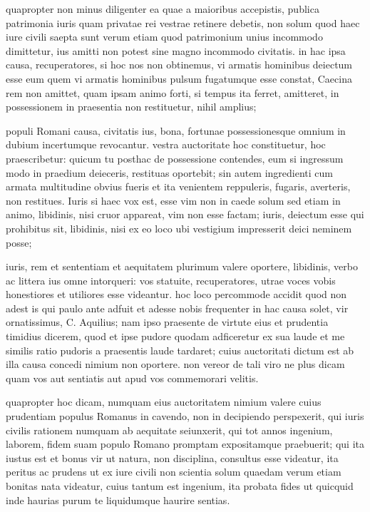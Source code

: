  quapropter non minus diligenter ea quae a maioribus accepistis, publica patrimonia iuris quam privatae rei vestrae retinere debetis, non solum quod haec iure civili saepta sunt verum etiam quod patrimonium unius incommodo dimittetur, ius amitti non potest sine magno incommodo civitatis. in hac ipsa causa, recuperatores, si hoc nos non obtinemus, vi armatis hominibus deiectum esse eum quem vi armatis hominibus pulsum fugatumque esse constat, Caecina rem non amittet, quam ipsam animo forti, si tempus ita ferret, amitteret, in possessionem in praesentia non restituetur, nihil amplius;

 populi Romani causa, civitatis ius, bona, fortunae possessionesque omnium in dubium incertumque revocantur. vestra auctoritate hoc constituetur, hoc praescribetur: quicum tu posthac de possessione contendes, eum si ingressum modo in praedium deieceris, restituas oportebit; sin autem ingredienti cum armata multitudine obvius fueris et ita venientem reppuleris, fugaris, averteris, non restitues. Iuris si haec vox est, esse vim non in caede solum sed etiam in animo, libidinis, nisi cruor appareat, vim non esse factam; iuris, deiectum esse qui prohibitus sit, libidinis, nisi ex eo loco ubi vestigium impresserit deici neminem posse;

 iuris, rem et sententiam et aequitatem plurimum valere oportere, libidinis, verbo ac littera ius omne intorqueri: vos statuite, recuperatores, utrae voces vobis honestiores et utiliores esse videantur. hoc loco percommode accidit quod non adest is qui paulo ante adfuit et adesse nobis frequenter in hac causa solet, vir ornatissimus, C. Aquilius; nam ipso praesente de virtute eius et prudentia timidius dicerem, quod et ipse pudore quodam adficeretur ex sua laude et me similis ratio pudoris a praesentis laude tardaret; cuius auctoritati dictum est ab illa causa concedi nimium non oportere. non vereor de tali viro ne plus dicam quam vos aut sentiatis aut apud vos commemorari velitis.

 quapropter hoc dicam, numquam eius auctoritatem nimium valere cuius prudentiam populus Romanus in cavendo, non in decipiendo perspexerit, qui iuris civilis rationem numquam ab aequitate seiunxerit, qui tot annos ingenium, laborem, fidem suam populo Romano promptam expositamque praebuerit; qui ita iustus est et bonus vir ut natura, non disciplina, consultus esse videatur, ita peritus ac prudens ut ex iure civili non scientia solum quaedam verum etiam bonitas nata videatur, cuius tantum est ingenium, ita probata fides ut quicquid inde haurias purum te liquidumque haurire sentias.

